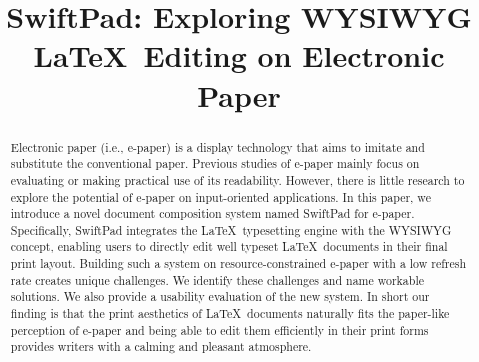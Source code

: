 \documentclass[]{sigchi}
\begin{document}
\title{SwiftPad: Exploring WYSIWYG \LaTeX\ Editing on Electronic Paper}

  











\maketitle

\begin{abstract}
Electronic paper (i.e., e-paper) is a display technology that aims to imitate and substitute the conventional paper.
Previous studies of e-paper mainly focus on evaluating or making practical use of its readability. However, there is little research to explore the potential of e-paper on input-oriented applications. 
In this paper, we introduce a novel document composition system named SwiftPad for e-paper.
Specifically, SwiftPad integrates the \LaTeX\ typesetting engine with the WYSIWYG concept,
enabling users to directly edit well typeset \LaTeX\ documents in their final print layout. 
Building such a system on resource-constrained e-paper with a low refresh rate creates unique challenges.
We identify these challenges and name workable solutions. 
We also provide a usability evaluation of the new system. 
In short our finding is that the print aesthetics of \LaTeX\ documents naturally fits the paper-like perception of e-paper and being able to edit them efficiently in their print forms provides writers with a calming and pleasant atmosphere.






\end{abstract}
\end{document}
